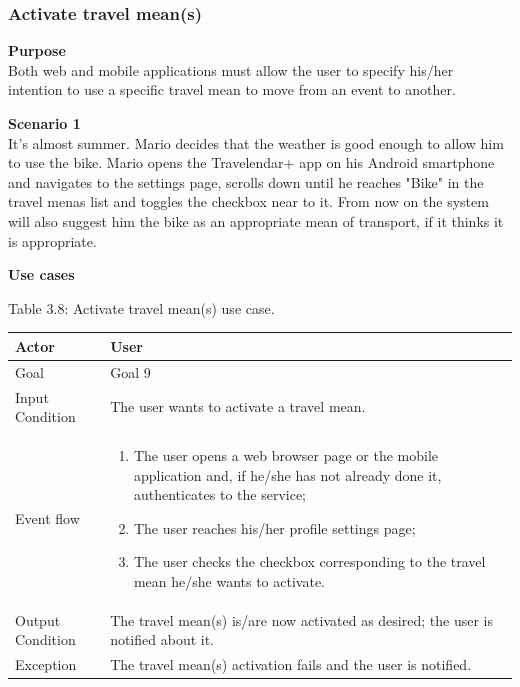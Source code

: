 \documentclass{article}
\begin{document}
	\subsubsection{Activate travel mean(s)}
	
	\bigskip
	\noindent
	\textbf{Purpose} \\
	Both web and mobile applications must allow the user to specify his/her intention to use a specific travel mean to move from an event to another.
	
	\bigskip
	\noindent
	\textbf{Scenario 1} \\
	It’s almost summer. Mario decides that the weather is good enough to allow him to use the bike. Mario opens the Travelendar+ app on his Android smartphone and navigates to the settings page, scrolls down until he reaches "Bike" in the travel menas list and toggles the checkbox near to it. From now on the system will also suggest him the bike as an appropriate mean of transport, if it thinks it is appropriate.
	
	\bigskip
	\noindent
	\textbf{Use cases} \\
	
	\begin{center}
		Table 3.8: Activate travel mean(s) use case.
		
		\bigskip
    		\begin{tabular}{p{}|p{}}
   		 	\hline
    			Actor & User \\ \hline
    			Goal & Goal 9 \\ \hline
    			Input Condition & The user wants to activate a travel mean. \\ \hline
    			Event flow & 
			\begin{enumerate}
  				\item The user opens a web browser page or the mobile application and, if he/she has not already done it, authenticates to the service;
  				\item The user reaches his/her profile settings page;
  				\item The user checks the checkbox corresponding to the travel mean he/she wants to activate.
 			 \end{enumerate} \\ \hline
    			Output Condition & The travel mean(s) is/are now activated as desired; the user is notified about it. \\ \hline
    			Exception & The travel mean(s) activation fails and the user is notified. \\ \hline
    		\end{tabular}
	\end{center}
	
\end{document}
